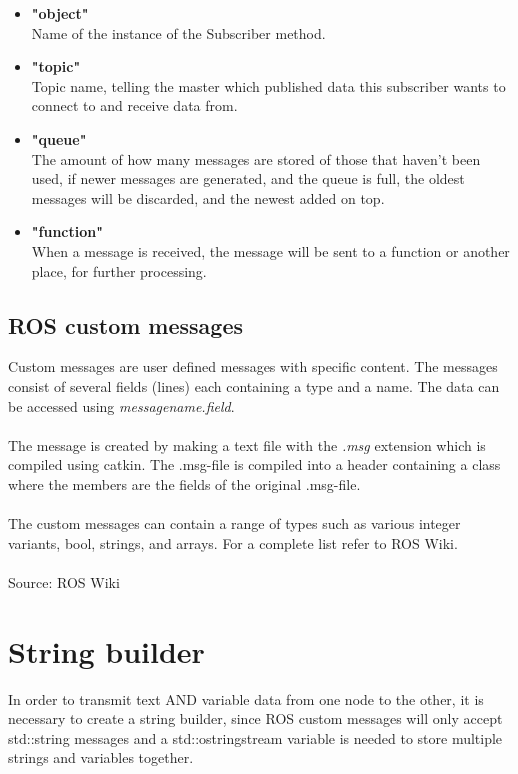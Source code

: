 \begin{itemize}
\setlength{\itemsep}{0.05\baselineskip}

    \item \textbf{"object"}     \\Name of the instance of the Subscriber method.
    
    \item \textbf{"topic"}      \\Topic name, telling the master which published data this subscriber wants to connect to and receive data from. 
    
    \item \textbf{"queue"}      \\The amount of how many messages are stored of those that haven't been used, if newer messages are generated, and the queue is full, the oldest messages will be discarded, and the newest added on top. 
    
    \item \textbf{"function"}   \\When a message is received, the message will be sent to a function or another place, for further processing.
    
\end{itemize}

\newpage

\subsection{ROS custom messages}
Custom messages are user defined messages with specific content. The messages consist of several fields (lines) each containing a type and a name. The data can be accessed using \textit{messagename.field}.\\
\\
The message is created by making a text file with the \textit{.msg} extension which is compiled using catkin. The .msg-file is compiled into a header containing a class where the members are the fields of the original .msg-file.\\
\\
The custom messages can contain a range of types such as various integer variants, bool, strings, and arrays. For a complete list refer to ROS Wiki.\\
\\
Source: ROS Wiki\cite{ROS_msg}

\section{String builder}
In order to transmit text AND variable data from one node to the other, it is necessary to create a string builder, since ROS custom messages will only accept std::string messages\cite{ROS_msg} and a std::ostringstream variable is needed to store multiple strings and variables together.

